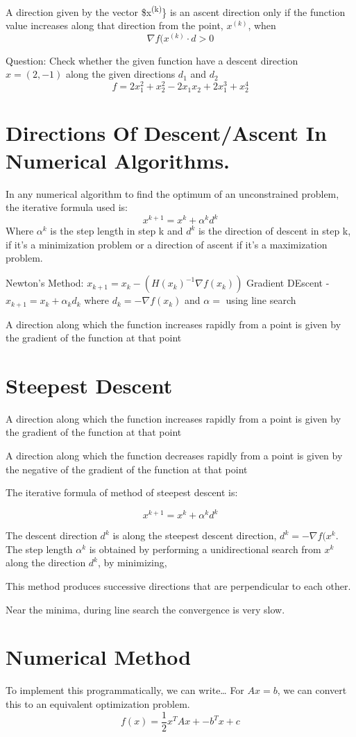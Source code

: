 \documentclass[11pt]{report}
\begin{document}
A direction given by the vector \$x\textsuperscript{(k)}\} is an ascent direction only if the function value increases along that direction from the point, \(x^{(k)}\), when
$$\nabla f(x^{(k)}\cdot d > 0$$

Question: Check whether the given function have a descent direction \(x = (2,-1)\) along the given directions \(d_1\) and \(d_2\)
$$f = 2x_1^{2} + x_2^2-2x_1x_2 + 2x_1^3 + x_2^4$$
\section{Directions Of Descent/Ascent In Numerical Algorithms.}
\label{sec:orgeaeb6a6}
In any numerical algorithm to find the optimum of an unconstrained problem, the iterative formula used is:
$$x^{k+1} = x^k + \alpha^kd^k$$
Where \(\alpha^k\) is the step length in step k and \(d^k\) is the direction of descent in step k, if it's a minimization problem or a direction of ascent if it's a maximization problem.

Newton's Method: \(x_{k+1} = x_k -(H(x_k)^{-1}\nabla f(x_k))\)
Gradient DEscent - \(x_{k+1} = x_k + \alpha_kd_k\) where \(d_k = - \nabla f(x_k)\) and \(\alpha =\) using line search

A direction along which the function increases rapidly from a point is given by the gradient of the function at that point
\section{Steepest Descent}
\label{sec:org5f1681a}
A direction along which the function increases rapidly from a point is given by the gradient of the function at that point

A direction along which the function decreases rapidly from a point is given by the negative of the gradient of the function at that point

The iterative formula of method of steepest descent is:

$$x^{k+1} = x^k + \alpha^k d^k$$

The descent direction \(d^k\) is along the steepest descent direction, \(d^k = - \nabla f(x^k\). The step length \(\alpha^k\) is obtained by performing a unidirectional search from \(x^k\) along the direction \(d^k\), by minimizing,

This method produces successive directions that are perpendicular to each other.

Near the minima, during line search the convergence is very slow.
\section{Numerical Method}
\label{sec:orgd192a91}
To implement this programmatically, we can write\ldots{}
For \(Ax=b\), we can convert this to an equivalent optimization problem.
$$f(x) = \frac{1}{2}x^TAx + - b^Tx + c$$
\end{document}
